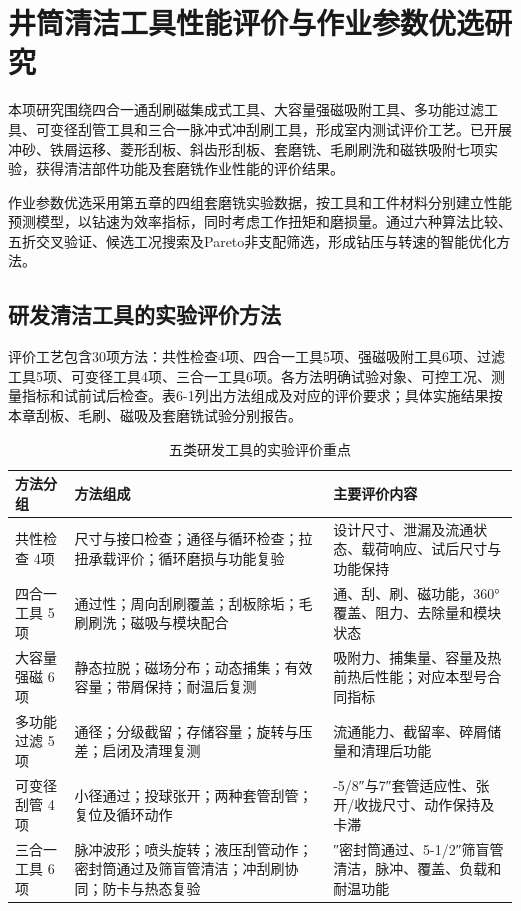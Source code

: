\chapter{井筒清洁工具性能评价与作业参数优选研究}
\label{chap:r46-5}

本项研究围绕四合一通刮刷磁集成式工具、大容量强磁吸附工具、多功能过滤工具、可变径刮管工具和三合一脉冲式冲刮刷工具，形成室内测试评价工艺。已开展冲砂、铁屑运移、菱形刮板、斜齿形刮板、套磨铣、毛刷刷洗和磁铁吸附七项实验，获得清洁部件功能及套磨铣作业性能的评价结果。

作业参数优选采用第五章的四组套磨铣实验数据，按工具和工件材料分别建立性能预测模型，以钻速为效率指标，同时考虑工作扭矩和磨损量。通过六种算法比较、五折交叉验证、候选工况搜索及Pareto非支配筛选，形成钻压与转速的智能优化方法。

\section{研发清洁工具的实验评价方法}
\label{sec:r46-5.1}
\label{guaban}


评价工艺包含30项方法：共性检查4项、四合一工具5项、强磁吸附工具6项、过滤工具5项、可变径工具4项、三合一工具6项。各方法明确试验对象、可控工况、测量指标和试前试后检查。表6-1列出方法组成及对应的评价要求；具体实施结果按本章刮板、毛刷、磁吸及套磨铣试验分别报告。

\begin{table}[H]
\centering
{}
\fontsize{12}{15}\selectfont
\setlength{\tabcolsep}{3pt}
\renewcommand{\arraystretch}{1.5}
\caption{五类研发工具的实验评价重点}\label{tab:r46-5-1}
\begin{tabular}{>{\centering\arraybackslash}m{0.219162\dimexpr\linewidth-6\tabcolsep-4\arrayrulewidth\relax}>{\centering\arraybackslash}m{0.445210\dimexpr\linewidth-6\tabcolsep-4\arrayrulewidth\relax}>{\centering\arraybackslash}m{0.335629\dimexpr\linewidth-6\tabcolsep-4\arrayrulewidth\relax}}
\toprule
 方法分组 & 方法组成 & 主要评价内容 \\ \midrule
共性检查 4项 & 尺寸与接口检查；通径与循环检查；拉扭承载评价；循环磨损与功能复验 & 设计尺寸、泄漏及流通状态、载荷响应、试后尺寸与功能保持 \\ 
四合一工具 5项 & 通过性；周向刮刷覆盖；刮板除垢；毛刷刷洗；磁吸与模块配合 & 通、刮、刷、磁功能，360°覆盖、阻力、去除量和模块状态 \\ 
大容量强磁 6项 & 静态拉脱；磁场分布；动态捕集；有效容量；带屑保持；耐温后复测 & 吸附力、捕集量、容量及热前热后性能；对应本型号合同指标 \\ 
多功能过滤 5项 & 通径；分级截留；存储容量；旋转与压差；启闭及清理复测 & 流通能力、截留率、碎屑储量和清理后功能 \\ 
可变径刮管 4项 & 小径通过；投球张开；两种套管刮管；复位及循环动作 & 9-5/8″与7″套管适应性、张开/收拢尺寸、动作保持及卡滞 \\ 
三合一工具 6项 & 脉冲波形；喷头旋转；液压刮管动作；密封筒通过及筛盲管清洁；冲刮刷协同；防卡与热态复验 & 4.75″密封筒通过、5-1/2″筛盲管清洁，脉冲、覆盖、负载和耐温功能 \\ \bottomrule
\end{tabular}
\end{table}

